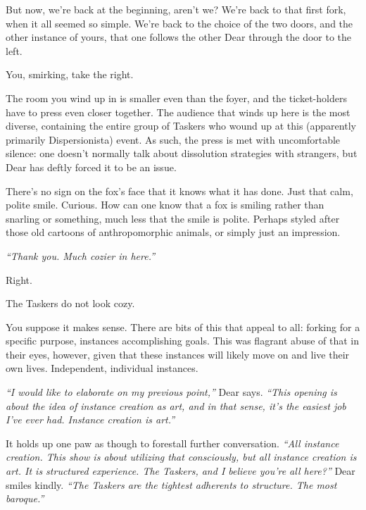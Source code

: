 \newpage
\null
\newpage
\null
\newpage

\null
\vfill

But now, we're back at the beginning, aren't we? We're back to that first fork, when it all seemed so simple. We're back to the choice of the two doors, and the other instance of yours, that one follows the other Dear through the door to the left.

You, smirking, take the right.

The room you wind up in is smaller even than the foyer, and the ticket-holders have to press even closer together. The audience that winds up here is the most diverse, containing the entire group of Taskers who wound up at this (apparently primarily Dispersionista) event. As such, the press is met with uncomfortable silence: one doesn't normally talk about dissolution strategies with strangers, but Dear has deftly forced it to be an issue.

There's no sign on the fox's face that it knows what it has done. Just that calm, polite smile. Curious. How can one know that a fox is smiling rather than snarling or something, much less that the smile is polite. Perhaps styled after those old cartoons of anthropomorphic animals, or simply just an impression.

\emph{``Thank you. Much cozier in here.''}

\vfill

\newpage

\null
\vfill

Right.

\null
\vfill

The Taskers do not look cozy.

\null
\vfill

\newpage

\null
\vfill

You suppose it makes sense. There are bits of this that appeal to all: forking for a specific purpose, instances accomplishing goals. This was flagrant abuse of that in their eyes, however, given that these instances will likely move on and live their own lives. Independent, individual instances.

\emph{``I would like to elaborate on my previous point,''} Dear says. \emph{``This opening is about the idea of instance creation as art, and in that sense, it's the easiest job I've ever had. Instance creation is art.''}

It holds up one paw as though to forestall further conversation. \emph{``All instance creation. This show is about utilizing that consciously, but all instance creation is art. It is structured experience. The Taskers, and I believe you're all here?''} Dear smiles kindly. \emph{``The Taskers are the tightest adherents to structure. The most baroque.''}

